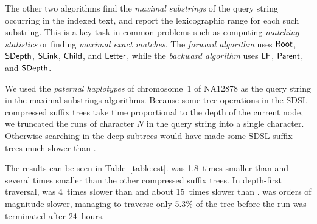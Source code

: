 The other two algorithms find the \emph{maximal substrings} of the query string
occurring in the indexed text, and report the lexicographic range for each such
substring. This is a key task in common problems such as computing
\emph{matching statistics} \cite{Chang1994} or finding \emph{maximal exact matches}.
The \emph{forward algorithm} uses $\mathsf{Root}$, $\mathsf{SDepth}$, $\mathsf{SLink}$, $\mathsf{Child}$,
and $\mathsf{Letter}$, while the \emph{backward algorithm} \cite{Ohlebusch2010a} uses
$\mathsf{LF}$, $\mathsf{Parent}$, and $\mathsf{SDepth}$.

We used the \emph{paternal haplotypes} of chromosome~1 of NA12878 as the
query string in the maximal substrings algorithms. Because some tree operations
in the SDSL compressed suffix trees take time proportional to the depth of the
current node, we truncated the runs of character $N$ in the query string into
a single character. Otherwise searching in the deep subtrees would have
made some SDSL suffix trees much slower than \RST.

The results can be seen in Table~\ref{table:cst}. \RST{} was 1.8~times smaller
than \FCST{} and several times smaller than the other compressed suffix trees.
In depth-first traversal, \RST{} was 4~times slower than \CSTnpr{} and
about 15~times slower than \CSTsada. \FCST{} was orders of magnitude slower,
managing to traverse only 5.3\% of the tree before the run was terminated after
24~hours.

